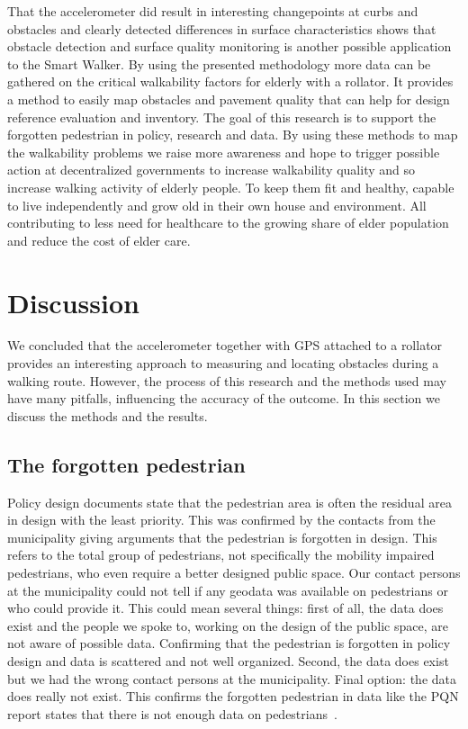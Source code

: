 That the accelerometer did result in interesting changepoints at curbs and obstacles and clearly detected differences in surface characteristics shows that obstacle detection and surface quality monitoring is another possible application to the Smart Walker. By using the presented methodology more data can be gathered on the critical walkability factors for elderly with a rollator. It provides a method to easily map obstacles and pavement quality that can help for design reference evaluation and inventory. The goal of this research is to support the forgotten pedestrian in policy, research and data. By using these methods to map the walkability problems we raise more awareness and hope to trigger possible action at decentralized governments to increase walkability quality and so increase walking activity of elderly people. To keep them fit and healthy, capable to live independently and grow old in their own house and environment. All contributing to less need for healthcare to the growing share of elder population and reduce the cost of elder care.

\section{Discussion} %
We concluded that the accelerometer together with GPS attached to a rollator provides an interesting approach to measuring and locating obstacles during a walking route. However, the process of this research and the methods used may have many pitfalls, influencing the accuracy of the outcome. In this section we discuss the methods and the results. 

\subsection{The forgotten pedestrian}
Policy design documents state that the pedestrian area is often the residual area in design with the least priority. This was confirmed by the contacts from the municipality giving arguments that the pedestrian is forgotten in design. This refers to the total group of pedestrians, not specifically the mobility impaired pedestrians, who even require a better designed public space. 
Our contact persons at the municipality could not tell if any geodata was available on pedestrians or who could provide it. This could mean several things: first of all, the data does exist and the people we spoke to, working on the design of the public space, are not aware of possible data. Confirming that the pedestrian is forgotten in policy design and data is scattered and not well organized. Second, the data does exist but we had the wrong contact persons at the municipality. Final option: the data does really not exist. This confirms the forgotten pedestrian in data like the PQN report states that there is not enough data on pedestrians~\cite{Sauter2010}. 

